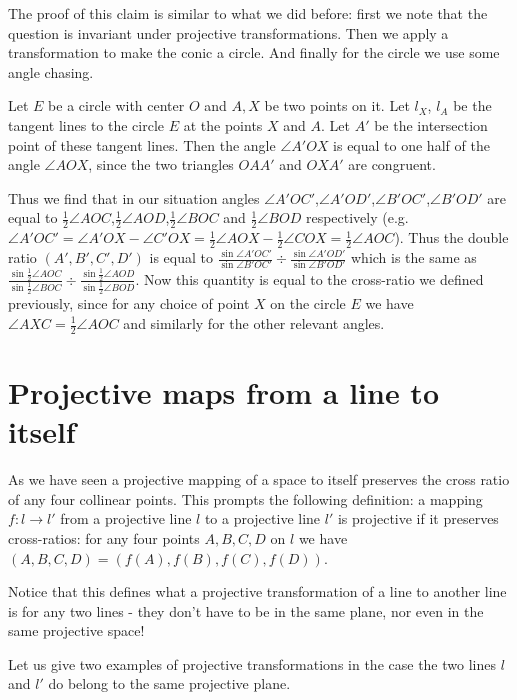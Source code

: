 The proof of this claim is similar to what we did before: first we note that the question is invariant under projective transformations. Then we apply a transformation to make the conic a circle. And finally for the circle we use some angle chasing.

Let $E$ be a circle with center $O$ and $A,X$ be two points on it. Let $l_X$, $l_A$ be the tangent lines to the circle $E$ at the points $X$ and $A$. Let $A'$ be the intersection point of these tangent lines. Then the angle $\angle A'OX$ is equal to one half of the angle $\angle AOX$, since the two triangles $OAA'$ and $OXA'$ are congruent.

Thus we find that in our situation angles $\angle A'OC'$,$\angle A'OD'$,$\angle B'OC'$,$\angle B'OD'$ are equal to $\frac{1}{2}\angle AOC$,$\frac{1}{2}\angle AOD$,$\frac{1}{2}\angle BOC$ and $\frac{1}{2}\angle BOD$ respectively (e.g. $\angle A'OC'=\angle A'OX - \angle C'OX=\frac{1}{2} \angle AOX - \frac{1}{2} \angle COX= \frac{1}{2} \angle AOC$). Thus the double ratio $(A',B',C',D')$ is equal to $\frac{\sin\angle A'O C'}{\sin \angle B'OC'}\div\frac{\sin\angle A'OD'}{\sin \angle B'OD'}$ which is the same as $\frac{\sin\frac{1}{2}\angle AO C}{\sin \frac{1}{2}\angle BOC}\div\frac{\sin\frac{1}{2}\angle AOD}{\sin \frac{1}{2}\angle BOD}$. Now this quantity is equal to the cross-ratio we defined previously, since for any choice of point $X$ on the circle $E$ we have $\angle AXC=\frac{1}{2} \angle AOC$ and similarly for the other relevant angles.

\section{Projective maps from a line to itself}

As we have seen a projective mapping of a space to itself preserves the cross ratio of any four collinear points. This prompts the following definition: a mapping $f:l\rightarrow l'$ from a projective line $l$ to a projective line $l'$ is projective if it preserves cross-ratios: for any four points $A,B,C,D$ on $l$ we have $(A,B,C,D)=(f(A),f(B),f(C),f(D))$.

Notice that this defines what a projective transformation of a line to another line is for any two lines - they don't have to be in the same plane, nor even in the same projective space!

Let us give two examples of projective transformations in the case the two lines $l$ and $l'$ do belong to the same projective plane.

